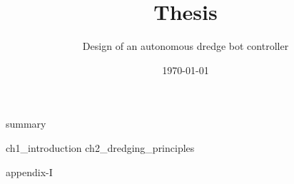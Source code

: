 \documentclass[english, businessunit=mti, status=concept]{IHCreport}
\title{Thesis}
\subtitle{Design of an autonomous dredge bot controller}
\date{\today}
\begin{document}

%
\begin{front}[]
 {summary}
\end{front}

\begin{main}
 {ch1_introduction}
 {ch2_dredging_principles}
\end{main}

\begin{back}[]
 \printglossaries
 \printbibliography
 \begin{app}
  {appendix-I}
 \end{app}
\end{back}
\end{document}
